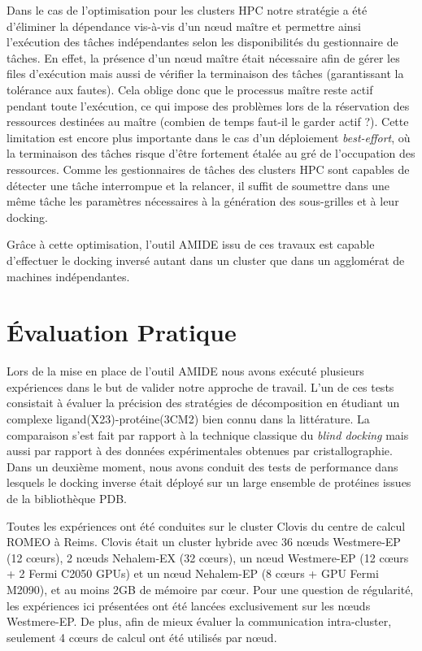  Dans le cas de l'optimisation pour les clusters HPC notre stratégie a été d'éliminer la dépendance vis-à-vis d'un n{\oe}ud maître et permettre ainsi l'exécution des tâches indépendantes selon les disponibilités du gestionnaire de tâches. En effet, la présence d'un n{\oe}ud maître était nécessaire afin de gérer les files d'exécution mais aussi de vérifier la terminaison des tâches (garantissant la tolérance aux fautes). Cela oblige donc que le processus maître reste actif pendant toute l'exécution, ce qui impose des problèmes lors de la réservation des ressources destinées au maître (combien de temps faut-il le garder actif ?). Cette limitation est encore plus importante dans le cas d'un déploiement \textit{best-effort}, où la terminaison des tâches risque d'être fortement étalée au gré de l'occupation des ressources. Comme les gestionnaires de tâches des clusters HPC sont capables de détecter une tâche interrompue et la relancer, il suffit de soumettre dans une même tâche les paramètres nécessaires à la génération des sous-grilles et à leur docking. 
 
 Grâce à cette optimisation, l'outil AMIDE issu de ces travaux est capable d'effectuer le docking inversé autant dans un cluster que dans un agglomérat de machines indépendantes.
 
 \section{Évaluation Pratique}
 
 Lors de la mise en place de l'outil AMIDE nous avons exécuté plusieurs expériences dans le but de valider notre approche de travail. L'un de ces tests consistait à évaluer la précision des stratégies de décomposition en étudiant un complexe ligand(X23)-protéine(3CM2) bien connu dans la littérature. La comparaison s'est fait par rapport à la technique classique du \textit{blind docking} mais aussi par rapport à des données expérimentales obtenues par cristallographie. Dans un deuxième moment, nous avons conduit des tests de performance dans lesquels le docking inverse était déployé sur un large ensemble de protéines issues de la bibliothèque PDB.
 
Toutes les expériences ont été conduites sur le cluster Clovis du centre de calcul ROMEO à Reims. Clovis était un cluster hybride avec 36 n{\oe}uds Westmere-EP (12 c{\oe}urs), 2 n{\oe}uds Nehalem-EX (32 c{\oe}urs), un n{\oe}ud Westmere-EP (12 c{\oe}urs + 2 Fermi C2050 GPUs) et un n{\oe}ud Nehalem-EP (8 c{\oe}urs + GPU Fermi M2090), et au moins 2GB de mémoire par c{\oe}ur. Pour une question de régularité, les expériences ici présentées ont été lancées exclusivement sur les n{\oe}uds Westmere-EP. De plus, afin de mieux évaluer la communication intra-cluster, seulement 4 c{\oe}urs de calcul ont été utilisés par n{\oe}ud.
 
